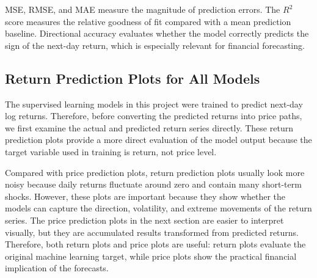 \documentclass[12pt]{article}
\begin{document}
MSE, RMSE, and MAE measure the magnitude of prediction errors. The $R^2$ score measures the relative goodness of fit compared with a mean prediction baseline. Directional accuracy evaluates whether the model correctly predicts the sign of the next-day return, which is especially relevant for financial forecasting.


\subsection{Return Prediction Plots for All Models}

The supervised learning models in this project were trained to predict next-day log returns. Therefore, before converting the predicted returns into price paths, we first examine the actual and predicted return series directly. These return prediction plots provide a more direct evaluation of the model output because the target variable used in training is return, not price level.

Compared with price prediction plots, return prediction plots usually look more noisy because daily returns fluctuate around zero and contain many short-term shocks. However, these plots are important because they show whether the models can capture the direction, volatility, and extreme movements of the return series. The price prediction plots in the next section are easier to interpret visually, but they are accumulated results transformed from predicted returns. Therefore, both return plots and price plots are useful: return plots evaluate the original machine learning target, while price plots show the practical financial implication of the forecasts.

\end{document}
